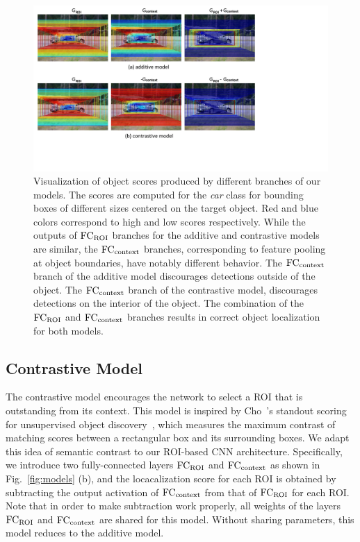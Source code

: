 \begin{figure}[t]
\centering
\includegraphics[width=\textwidth, trim={0mm 3.5cm 8cm 0cm},clip]{eccv16_figures/modelvis.pdf}
\caption[Visualization of object scores produced by different branches of our models]{
Visualization of object scores produced by different branches of our models. The scores are computed
for the {\em car} class for bounding boxes of different sizes centered on the target object. Red and blue
colors correspond to high and low scores respectively. While the outputs of ${\rm FC_{ROI}}$ branches for the
additive and contrastive models are similar, the ${\rm FC_{context}}$ branches, corresponding to feature
pooling at object boundaries, have notably different behavior. The ${\rm FC_{context}}$ branch of the additive model
discourages detections outside of the object. The ${\rm FC_{context}}$ branch of the contrastive model, discourages
detections on the interior of the object. The combination of the ${\rm FC_{ROI}}$ and ${\rm FC_{context}}$ branches results in correct object
localization for both models.
}
\label{fig:modelvis}
\end{figure}

\subsection{Contrastive Model} \label{sec:contrastive}



The contrastive model encourages the network to select a ROI that is
outstanding from its context.  This model is inspired by Cho~\etal's
standout scoring for unsupervised object discovery~\cite{Cho:2015vz}, which
measures the maximum contrast of matching scores between a rectangular box and
its surrounding boxes. We adapt this idea of semantic contrast to our ROI-based
CNN architecture. Specifically, we introduce two fully-connected layers ${\rm FC_{ROI}}$ and ${\rm FC_{context}}$ as shown in Fig.~\ref{fig:models} (b), and the locacalization score for each ROI is obtained by subtracting the output activation of ${\rm FC_{context}}$ from that of ${\rm FC_{ROI}}$ for each ROI.
Note that in order to make subtraction work properly, all weights of the layers ${\rm
FC_{ROI}}$ and ${\rm FC_{context}}$ are shared for this model. Without sharing parameters, this model reduces to the additive model.  %

